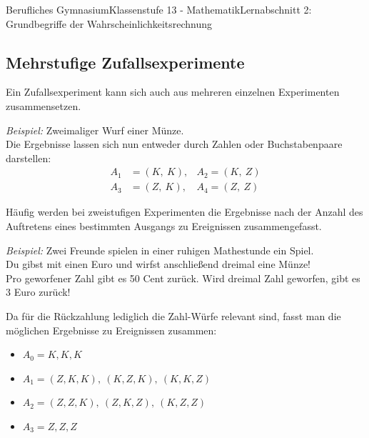 \documentclass[11pt,twocolumn,oneside,openany,headings=optiontotoc,11pt,numbers=noenddot]{article}
\begin{document}
\begin{worksheet}{Berufliches Gymnasium}{Klassenstufe 13 - Mathematik}{Lernabschnitt 2: Grundbegriffe der Wahrscheinlichkeitsrechnung}
		\subsection{Mehrstufige Zufallsexperimente}
		Ein Zufallsexperiment kann sich auch aus mehreren einzelnen Experimenten zusammensetzen.\\
		\par
		\setlength{\leftskip}{0.5cm}
		\par\noindent
		\textit{Beispiel:} Zweimaliger Wurf einer Münze.\\
		Die Ergebnisse lassen sich nun entweder durch Zahlen oder Buchstabenpaare darstellen:
		\begin{align*}
			A_1 & = (K,\ K), & A_2 = (K,\ Z)\\
			A_3 & = (Z,\ K), & A_4 = (Z,\ Z)
		\end{align*}
		\par
		\setlength{\leftskip}{0cm}
		\par\noindent
		Häufig werden bei zweistufigen Experimenten die Ergebnisse nach der Anzahl des Auftretens eines bestimmten Ausgangs zu Ereignissen zusammengefasst.\\
		\par
		\setlength{\leftskip}{0.5cm}
		\par\noindent
		\textit{Beispiel:} Zwei Freunde spielen in einer ruhigen Mathestunde ein Spiel.\\
		\glqq{}Du gibst mit einen Euro und wirfst anschließend dreimal eine Münze!\grqq{}\\
		Pro geworfener \grq{}Zahl\grq{} gibt es 50 Cent zurück. Wird dreimal \grq{}Zahl\grq{} geworfen, gibt es 3 Euro zurück!\\
		\par\noindent
		Da für die Rückzahlung lediglich die \grq{}Zahl-Würfe\grq{} relevant sind, fasst man die möglichen Ergebnisse zu Ereignissen zusammen:
		\begin{itemize}[label=-]
			\item \(A_0 = {K,K,K}\)
			\item \(A_1 = {(Z,K,K),\ (K,Z,K),\ (K,K,Z)}\)
			\item \(A_2 = {(Z,Z,K),\ (Z,K,Z),\ (K,Z,Z)}\)
			\item \(A_3 = {Z,Z,Z}\)
		\end{itemize}
		\setlength{\leftskip}{0cm}
		\par\noindent

\end{worksheet}
\end{document}
